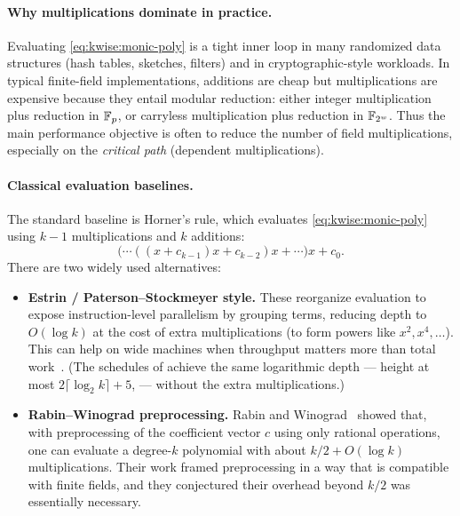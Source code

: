 \paragraph{Why multiplications dominate in practice.}
Evaluating \eqref{eq:kwise:monic-poly} is a tight inner loop in many randomized data structures
(hash tables, sketches, filters) and in cryptographic-style workloads.
In typical finite-field implementations, additions are cheap but multiplications are expensive
because they entail modular reduction:
either integer multiplication plus reduction in $\mathbb{F}_p$, or carryless multiplication plus
reduction in $\mathbb{F}_{2^w}$.
Thus the main performance objective is often to reduce the number of field multiplications,
especially on the \emph{critical path} (dependent multiplications).

\paragraph{Classical evaluation baselines.}
The standard baseline is Horner's rule, which evaluates \eqref{eq:kwise:monic-poly} using $k-1$
multiplications and $k$ additions:
\[
  \bigl(\cdots((x+c_{k-1})x + c_{k-2})x + \cdots \bigr)x + c_0.
\]
There are two widely used alternatives:
\begin{itemize}
  \item \textbf{Estrin / Paterson--Stockmeyer style.}
  These reorganize evaluation to expose instruction-level parallelism by grouping terms,
  reducing depth to $O(\log k)$ at the cost of extra multiplications (to form powers like $x^2,x^4,\dots$).
  This can help on wide machines when throughput matters more than total work~\cite{estrin1960organization,paterson1973evaluation}.
  (The schedules of  achieve the same logarithmic depth ---
  height at most $2\lceil\log_2k\rceil+5$, 
  --- without the extra multiplications.)
  \item \textbf{Rabin--Winograd preprocessing.}
  Rabin and Winograd~\cite{rabin1972number} showed that, with preprocessing of the coefficient
  vector $c$ using only rational operations, one can evaluate a degree-$k$ polynomial with
  about $k/2 + O(\log k)$ multiplications.
  Their work framed preprocessing in a way that is compatible with finite fields, and they
  conjectured their overhead beyond $k/2$ was essentially necessary.
\end{itemize}

